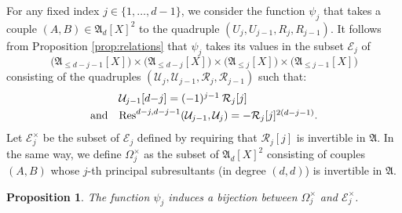\documentclass{jT}
\numberwithin{equation}{section}
\newtheorem{prop}[theo]{Proposition}
\theoremstyle{definition}
\newcommand{\ring}{\mathfrak A}
\renewcommand{\Res}{\text{\rm Res}}
\begin{document}
For any fixed index $j \in \{1, \ldots, d-1\}$, we consider the 
function $\psi_j$ that takes a couple $(A,B) \in \ring_d[X]^2$ to the
quadruple $(U_j, U_{j-1}, R_j, R_{j-1})$. It follows from Proposition
\ref{prop:relations} that $\psi_j$ takes its values in the subset 
$\mathcal E_j$ of
$$\big(\ring_{\leq d-j-1}[X]\big) \times \big(\ring_{\leq d-j}[X]\big) \times 
\big(\ring_{\leq j}[X]\big) \times \big(\ring_{\leq j-1}[X]\big)$$
consisting of the quadruples $(\mathcal U_j, \mathcal U_{j-1}, \mathcal
R_j, \mathcal R_{j-1})$ such that:
$$\begin{array}{ll}
&\mathcal U_{j-1}[d{-}j] = (-1)^{j-1} \: \mathcal R_j[j] \smallskip \\
\text{and} &
\Res^{d-j,d-j-1}(\mathcal U_{j-1}, \mathcal U_j) = -\mathcal R_j[j]^{2(d-j-1)}.
\end{array}$$
Let $\mathcal E_j^\times$ be the subset of $\mathcal E_j$ defined by 
requiring that $\mathcal R_j[j]$ is invertible in $\ring$. In the same 
way, we define $\Omega_j^\times$ as the subset of $\ring_d[X]^2$ 
consisting of couples $(A,B)$ whose $j$-th principal subresultants (in 
degree $(d,d)$) is invertible in $\ring$.

\begin{prop}
\label{prop:bijection}
The function $\psi_j$ induces a bijection between
$\Omega_j^\times$ and $\mathcal E_j^\times$.
\end{prop}
\end{document}

